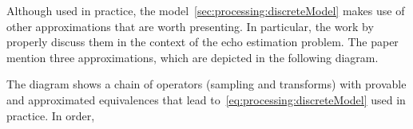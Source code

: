 \mynewline
Although used in practice, the model~\eqref{sec:processing:discreteModel} makes use of other approximations that are worth presenting.
In particular, the work by~ properly discuss them in the context of the echo estimation problem.
The paper mention three approximations, which are depicted in the following diagram.

\begin{figure}[!h]
    \begin{fullwidthfig}
    \centering
    
    \end{fullwidthfig}
\end{figure}

The diagram shows a chain of operators (sampling and transforms) with provable and approximated equivalences that lead to~\cref{eq:processing:discreteModel} used in practice.
In order,
